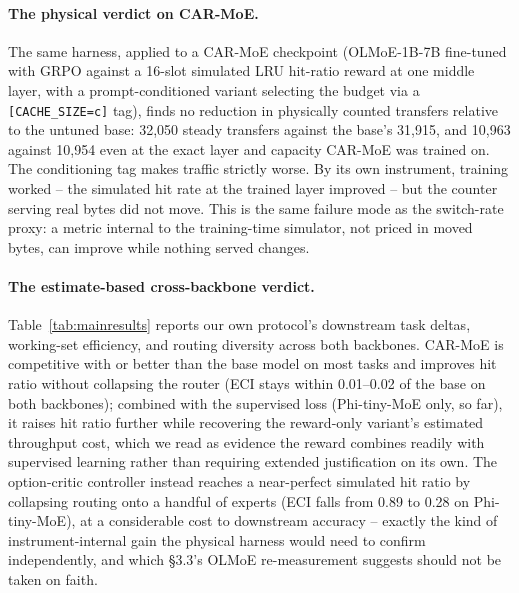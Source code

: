 \documentclass{article}
\begin{document}
\paragraph{The physical verdict on CAR-MoE.} The same harness, applied to a CAR-MoE
checkpoint (OLMoE-1B-7B fine-tuned with GRPO against a 16-slot simulated LRU hit-ratio
reward at one middle layer, with a prompt-conditioned variant selecting the budget via a
\texttt{[CACHE\_SIZE=c]} tag), finds no reduction in physically counted transfers relative to
the untuned base: 32,050 steady transfers against the base's 31,915, and 10,963 against
10,954 even at the exact layer and capacity CAR-MoE was trained on. The conditioning tag
makes traffic strictly worse. By its own instrument, training worked -- the simulated hit
rate at the trained layer improved -- but the counter serving real bytes did not move. This is
the same failure mode as the switch-rate proxy: a metric internal to the training-time
simulator, not priced in moved bytes, can improve while nothing served changes.

\paragraph{The estimate-based cross-backbone verdict.} Table~\ref{tab:mainresults} reports
our own protocol's downstream task deltas, working-set efficiency, and routing diversity
across both backbones. CAR-MoE is competitive with or better than the base model on most
tasks and improves hit ratio without collapsing the router (ECI stays within 0.01--0.02 of
the base on both backbones); combined with the supervised loss (Phi-tiny-MoE only, so far),
it raises hit ratio further while recovering the reward-only variant's estimated throughput
cost, which we read as evidence the reward combines readily with supervised learning rather
than requiring extended justification on its own. The option-critic controller instead
reaches a near-perfect simulated hit ratio by collapsing routing onto a handful of experts
(ECI falls from 0.89 to 0.28 on Phi-tiny-MoE), at a considerable cost to downstream accuracy
-- exactly the kind of instrument-internal gain the physical harness would need to confirm
independently, and which \S3.3's OLMoE re-measurement suggests should not be taken on faith.
\end{document}
